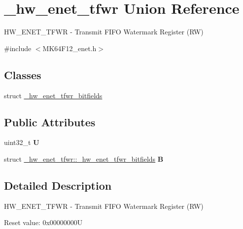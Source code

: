 \hypertarget{union__hw__enet__tfwr}{}\section{\+\_\+hw\+\_\+enet\+\_\+tfwr Union Reference}
\label{union__hw__enet__tfwr}


H\+W\+\_\+\+E\+N\+E\+T\+\_\+\+T\+F\+WR -\/ Transmit F\+I\+FO Watermark Register (RW)  




{\ttfamily \#include $<$M\+K64\+F12\+\_\+enet.\+h$>$}

\subsection*{Classes}
\begin{DoxyCompactItemize}
\item 
struct \hyperlink{struct__hw__enet__tfwr_1_1__hw__enet__tfwr__bitfields}{\+\_\+hw\+\_\+enet\+\_\+tfwr\+\_\+bitfields}
\end{DoxyCompactItemize}
\subsection*{Public Attributes}
\begin{DoxyCompactItemize}
\item 
uint32\+\_\+t {\bfseries U}\hypertarget{union__hw__enet__tfwr_acd6944ce35d73e0ce7fffcde55870a84}{}\label{union__hw__enet__tfwr_acd6944ce35d73e0ce7fffcde55870a84}

\item 
struct \hyperlink{struct__hw__enet__tfwr_1_1__hw__enet__tfwr__bitfields}{\+\_\+hw\+\_\+enet\+\_\+tfwr\+::\+\_\+hw\+\_\+enet\+\_\+tfwr\+\_\+bitfields} {\bfseries B}\hypertarget{union__hw__enet__tfwr_a5bca528a09f2f6bf07680f4544ba7568}{}\label{union__hw__enet__tfwr_a5bca528a09f2f6bf07680f4544ba7568}

\end{DoxyCompactItemize}


\subsection{Detailed Description}
H\+W\+\_\+\+E\+N\+E\+T\+\_\+\+T\+F\+WR -\/ Transmit F\+I\+FO Watermark Register (RW) 

Reset value\+: 0x00000000U

